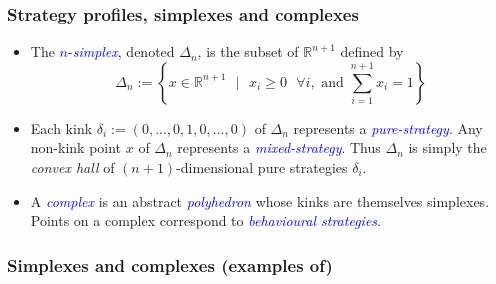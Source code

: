 \documentclass[xcolor=dvipsnames]{beamer}
\begin{document}
\begin{frame}
\frametitle{Strategy profiles, simplexes and complexes}
\begin{definition}
  \begin{itemize}[<+->]
    \item The \textcolor{blue}{$n$-\textit{simplex}}, denoted $\Delta_n$, is the subset of $\mathbb{R}^{n+1}$ defined by
      \begin{equation}
        \Delta_n := \left\{x \in \mathbb{R}^{n+1}\text{ }|\text{ } x_i \ge 0\text{ } \forall i, \text{ and } \sum_{i=1}^{n+1}{x_i} = 1\right\}
      \end{equation}
    \item Each kink $\delta_i := (0, ..., 0,1,0, ...,0)$ of $\Delta_n$ represents a \textit{\textcolor{blue}{pure-strategy}}.
      Any non-kink point $x$ of $\Delta_n$ represents a
      \textit{\textcolor{blue}{mixed-strategy}}. Thus $\Delta_n$ is simply the \textit{convex hall} of $(n+1)$-dimensional pure strategies $\delta_i$.
    \item A \textit{\textcolor{blue}{complex}} is an abstract \textit{\textcolor{blue}{polyhedron}} whose kinks are themselves simplexes. Points on
      a complex correspond to \textit{\textcolor{blue}{behavioural strategies}}.
  \end{itemize}
\end{definition}
\end{frame}

\begin{frame}
\frametitle{Simplexes and complexes (examples of)}
\end{frame}
\end{document}
